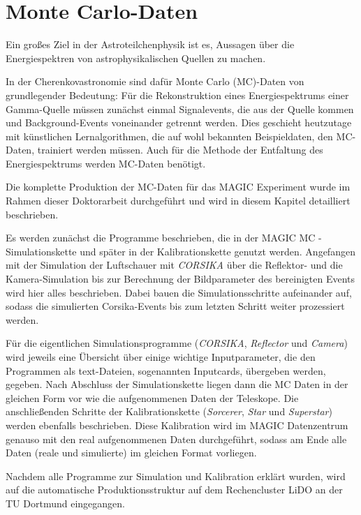 \chapter{Monte Carlo-Daten}

Ein großes Ziel in der Astroteilchenphysik ist es, Aussagen über die Energiespektren von astrophysikalischen Quellen zu machen.

In der Cherenkovastronomie sind dafür Monte Carlo (MC)-Daten von grundlegender Bedeutung:
Für die Rekonstruktion eines Energiespektrums einer Gamma-Quelle müssen zunächst einmal Signalevents, die aus der Quelle kommen und Background-Events voneinander getrennt werden.
Dies geschieht heutzutage mit künstlichen Lernalgorithmen, die auf wohl bekannten Beispieldaten, den MC-Daten, trainiert werden müssen.
Auch für die Methode der Entfaltung des Energiespektrums werden MC-Daten benötigt.

Die komplette Produktion der MC-Daten für das MAGIC Experiment wurde im Rahmen dieser Doktorarbeit durchgeführt und wird in diesem Kapitel detailliert beschrieben.

Es werden zunächst die Programme beschrieben, die in der MAGIC MC - Simulationskette und später in der Kalibrationskette genutzt werden.
Angefangen mit der Simulation der Luftschauer mit \textit{CORSIKA} über die Reflektor- und die Kamera-Simulation bis zur Berechnung der Bildparameter des bereinigten Events wird hier alles beschrieben.
Dabei bauen die Simulationsschritte aufeinander auf, sodass die simulierten Corsika-Events bis zum letzten Schritt weiter prozessiert werden.

Für die eigentlichen Simulationsprogramme (\textit{CORSIKA}, \textit{Reflector} und \textit{Camera}) wird jeweils eine Übersicht über einige wichtige Inputparameter, die den Programmen als text-Dateien,
sogenannten Inputcards, übergeben werden, gegeben.
Nach Abschluss der Simulationskette liegen dann die MC Daten in der gleichen Form vor wie die aufgenommenen Daten der Teleskope. 
Die anschließenden Schritte der Kalibrationskette (\textit{Sorcerer}, \textit{Star} und \textit{Superstar}) werden ebenfalls beschrieben.
Diese Kalibration wird im MAGIC Datenzentrum genauso mit den real aufgenommenen Daten durchgeführt, sodass am Ende alle Daten (reale und simulierte) im gleichen Format vorliegen.

Nachdem alle Programme zur Simulation und Kalibration erklärt wurden, wird auf die automatische Produktionsstruktur auf dem Rechencluster LiDO an der TU Dortmund eingegangen.

